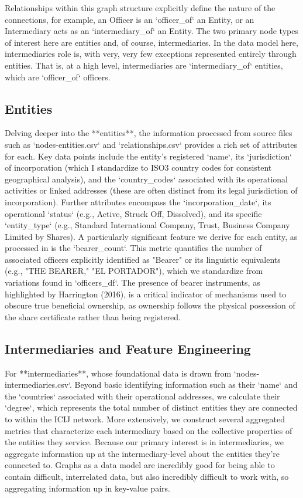 Relationships within this graph structure explicitly define the nature of the connections, for example, an Officer is an `officer_of` an Entity, or an Intermediary acts as an `intermediary_of` an Entity. The two primary node types of interest here are entities and, of course, intermediaries. In the data model here, intermediaries role is, with very, very few exceptions represented entirely through entities. That is, at a high level, intermediaries are `intermediary_of` entities, which are `officer_of` officers. 


\subsection{Entities}

Delving deeper into the **entities**, the information processed from source files such as `nodes-entities.csv` and `relationships.csv` provides a rich set of attributes for each. Key data points include the entity's registered `name`, its `jurisdiction` of incorporation (which I standardize to ISO3 country codes for consistent geographical analysis), and the `country_codes` associated with its operational activities or linked addresses (these are often distinct from its legal jurisdiction of incorporation). Further attributes encompass the `incorporation_date`, its operational `status` (e.g., Active, Struck Off, Dissolved), and its specific `entity_type` (e.g., Standard International Company, Trust, Business Company Limited by Shares). A particularly significant feature we derive for each entity, as processed in is the `bearer_count`. This metric quantifies the number of associated officers explicitly identified as "Bearer" or its linguistic equivalents (e.g., "THE BEARER," "EL PORTADOR"), which we standardize from variations found in `officers_df`. The presence of bearer instruments, as highlighted by Harrington (2016), is a critical indicator of mechanisms used to obscure true beneficial ownership, as ownership follows the physical possession of the share certificate rather than being registered.

\subsection{Intermediaries and Feature Engineering}

For **intermediaries**, whose foundational data is drawn from `nodes-intermediaries.csv`. Beyond basic identifying information such as their `name` and the `countries` associated with their operational addresses, we calculate their `degree`, which represents the total number of distinct entities they are connected to within the ICIJ network. More extensively, we construct several aggregated metrics that characterize each intermediary based on the collective properties of the entities they service. Because our primary interest is in intermediaries, we aggregate information up at the intermediary-level about the entities they're connected to. Graphs as a data model are incredibly good for being able to contain difficult, interrelated data, but also incredibly difficult to work with, so aggregating information up in key-value pairs. 

